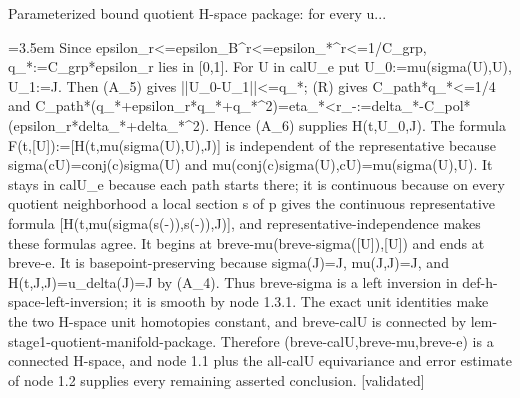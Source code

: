 \documentclass{article}
\newcommand{\step}[1]{\par\noindent\hangindent=3.5em\hangafter=1%
  \makebox[3.5em][l]{\textbf{#1.}}}
\newcommand{\steptag}[1]{\hfill{\small\textsf{[#1]}}}
\begin{document}
\begin{proofbox}{Parameterized bound quotient H-space package: for every u...}
\step{1.3.2} Since epsilon\_r<=epsilon\_B\textasciicircum{}r<=epsilon\_*\textasciicircum{}r<=1/C\_grp, q\_*:=C\_grp*epsilon\_r lies in [0,1]. For U in calU\_e put U\_0:=mu(sigma(U),U), U\_1:=J. Then (A\_5) gives ||U\_0-U\_1||<=q\_*; (R) gives C\_path*q\_*<=1/4 and C\_path*(q\_*+epsilon\_r*q\_*+q\_*\textasciicircum{}2)=eta\_*<r\_-:=delta\_*-C\_pol*(epsilon\_r*delta\_*+delta\_*\textasciicircum{}2). Hence (A\_6) supplies H(t,U\_0,J). The formula F(t,[U]):=[H(t,mu(sigma(U),U),J)] is independent of the representative because sigma(cU)=conj(c)sigma(U) and mu(conj(c)sigma(U),cU)=mu(sigma(U),U). It stays in calU\_e because each path starts there; it is continuous because on every quotient neighborhood a local section s of p gives the continuous representative formula [H(t,mu(sigma(s(-)),s(-)),J)], and representative-independence makes these formulas agree. It begins at breve-mu(breve-sigma([U]),[U]) and ends at breve-e. It is basepoint-preserving because sigma(J)=J, mu(J,J)=J, and H(t,J,J)=u\_delta(J)=J by (A\_4). Thus breve-sigma is a left inversion in def-h-space-left-inversion; it is smooth by node 1.3.1. The exact unit identities make the two H-space unit homotopies constant, and breve-calU is connected by lem-stage1-quotient-manifold-package. Therefore (breve-calU,breve-mu,breve-e) is a connected H-space, and node 1.1 plus the all-calU equivariance and error estimate of node 1.2 supplies every remaining asserted conclusion. \steptag{validated} \\[6pt]

\end{proofbox}
\end{document}
